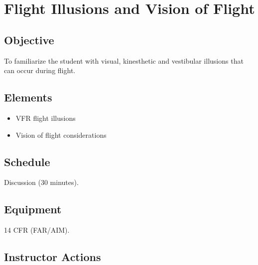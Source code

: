 \section{Flight Illusions and Vision of Flight}

\subsection{Objective}

To familiarize the student with visual, kinesthetic and vestibular illusions
that can occur during flight.

\subsection{Elements}

\begin{itemize}
  \item VFR flight illusions
  \item Vision of flight considerations
\end{itemize}

\subsection{Schedule}

Discussion (30 minutes).

\subsection{Equipment}

14 CFR (FAR/AIM).

\subsection{Instructor Actions}

